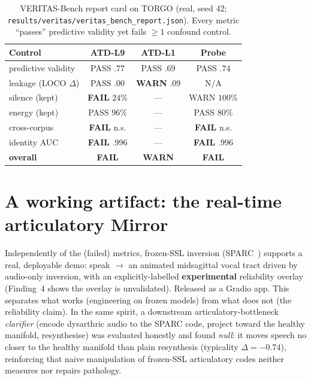 \documentclass[10pt,twocolumn]{article}
\begin{document}
\begin{table}[t]
\centering
\caption{VERITAS-Bench report card on TORGO (real, seed 42;
\texttt{results/veritas/veritas\_bench\_report.json}). Every metric ``passes''
predictive validity yet fails $\ge 1$ confound control.}
\label{tab:bench}
\small
\begin{tabular}{@{}lccc@{}}
\toprule
Control & ATD-L9 & ATD-L1 & Probe\\
\midrule
predictive validity      & PASS $.77$ & PASS $.69$ & PASS $.74$\\
leakage (LOCO $\Delta$)  & PASS $.00$ & \textbf{WARN} $.09$ & N/A\\
silence (kept)           & \textbf{FAIL} $24\%$ & --- & WARN $100\%$\\
energy (kept)            & PASS $96\%$ & --- & PASS $80\%$\\
cross-corpus             & \textbf{FAIL} n.s. & --- & \textbf{FAIL} n.s.\\
identity AUC             & \textbf{FAIL} $.996$ & --- & \textbf{FAIL} $.996$\\
\midrule
\textbf{overall}         & \textbf{FAIL} & \textbf{WARN} & \textbf{FAIL}\\
\bottomrule
\end{tabular}
\end{table}

\section{A working artifact: the real-time articulatory Mirror}
Independently of the (failed) metrics, frozen-SSL inversion
(SPARC~\cite{cho2024sparc}) supports a real, deployable demo: speak $\to$ an
animated midsagittal vocal tract driven by audio-only inversion, with an
explicitly-labelled \textbf{experimental} reliability overlay (Finding~4 shows
the overlay is unvalidated). Released as a Gradio app. This separates what works
(engineering on frozen models) from what does not (the reliability claim). In the
same spirit, a downstream articulatory-bottleneck \emph{clarifier} (encode
dysarthric audio to the SPARC code, project toward the healthy manifold,
resynthesise) was evaluated honestly and found \emph{null}: it moves speech no
closer to the healthy manifold than plain resynthesis (typicality
$\Delta{=}{-}0.74$), reinforcing that naive manipulation of frozen-SSL articulatory
codes neither measures nor repairs pathology.
\end{document}
